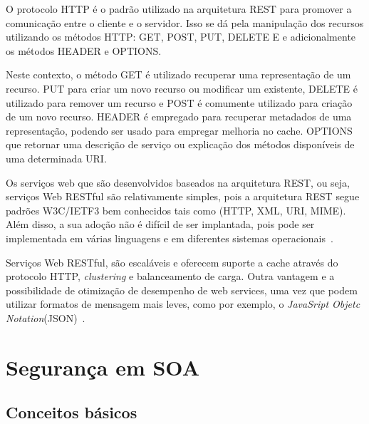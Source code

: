 O protocolo HTTP é o padrão utilizado na arquitetura REST para promover a comunicação entre o cliente e o servidor. Isso se dá pela manipulação dos recursos utilizando os métodos HTTP: GET, POST, PUT, DELETE E e adicionalmente os métodos HEADER e OPTIONS.

Neste contexto, o método GET é utilizado recuperar uma representação de um recurso. PUT para criar um novo recurso ou modificar um existente, DELETE é utilizado para remover um recurso e POST é comumente utilizado para criação de um novo recurso. HEADER é empregado para recuperar metadados de uma representação, podendo ser usado para empregar melhoria no cache. OPTIONS que retornar uma descrição de serviço ou explicação dos métodos disponíveis de uma determinada URI.



%

Os serviços web que são desenvolvidos baseados na arquitetura REST, ou seja, serviços Web RESTful  são relativamente simples, pois a arquitetura REST segue padrões W3C/IETF3 bem conhecidos tais como (HTTP, XML, URI, MIME). Além disso, a sua adoção não é difícil de ser implantada, pois pode ser implementada em várias linguagens e em diferentes sistemas operacionais~\cite{Pautasso2008}.

Serviços Web RESTful, são escaláveis e oferecem suporte a cache através do protocolo HTTP, \emph{clustering} e balanceamento de carga. Outra vantagem e a possibilidade de otimização de desempenho de web services, uma vez que podem utilizar formatos de mensagem mais leves, como por exemplo, o \emph{JavaSript Objetc Notation}(JSON)~\cite{Pautasso2008}.


\section{Segurança em SOA}

\subsection{Conceitos básicos}

